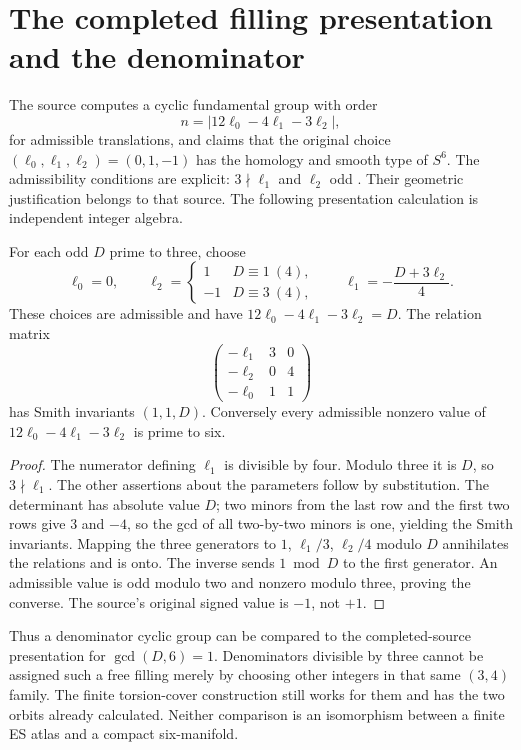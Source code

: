 \section{The completed filling presentation and the denominator}
The source computes a cyclic fundamental group with order
\[
 n=|12\ell_0-4\ell_1-3\ell_2|,
\]
for admissible translations, and claims that the original choice
$(\ell_0,\ell_1,\ell_2)=(0,1,-1)$ has the homology and smooth type of $S^6$.
The admissibility conditions are explicit:
$3\nmid\ell_1$ and $\ell_2$ odd \cite[Proposition 5.6 and \S7]{source}.
Their geometric justification belongs to that source. The following
presentation calculation is independent integer algebra.

\begin{proposition}
For each odd $D$ prime to three, choose
\[
 \ell_0=0,\qquad
 \ell_2=\begin{cases}1&D\equiv1\ (4),\\-1&D\equiv3\ (4),\end{cases}
 \qquad \ell_1=-\frac{D+3\ell_2}{4}.
\]
These choices are admissible and have $12\ell_0-4\ell_1-3\ell_2=D$.
The relation matrix
\[
 \begin{pmatrix}-\ell_1&3&0\\-\ell_2&0&4\\-\ell_0&1&1\end{pmatrix}
\]
has Smith invariants $(1,1,D)$. Conversely every admissible nonzero value
of $12\ell_0-4\ell_1-3\ell_2$ is prime to six.
\end{proposition}
\begin{proof}
The numerator defining $\ell_1$ is divisible by four. Modulo three it is
$D$, so $3\nmid\ell_1$. The other assertions about the parameters follow
by substitution. The determinant has absolute value $D$; two minors
from the last row and the first two rows give 3 and $-4$, so the gcd of
all two-by-two minors is one, yielding the Smith invariants. Mapping the
three generators to $1$, $\ell_1/3$, $\ell_2/4$ modulo $D$ annihilates the
relations and is onto. The inverse sends $1\bmod D$ to the first generator.
An admissible value is odd modulo two and nonzero modulo three, proving
the converse. The source's original signed value is $-1$, not $+1$.
\end{proof}

Thus a denominator cyclic group can be compared to the completed-source
presentation for $\gcd(D,6)=1$. Denominators divisible by three cannot
be assigned such a free filling merely by choosing other integers in
that same $(3,4)$ family. The finite torsion-cover construction still
works for them and has the two orbits already calculated.
Neither comparison is an isomorphism between a finite ES atlas and a
compact six-manifold.

